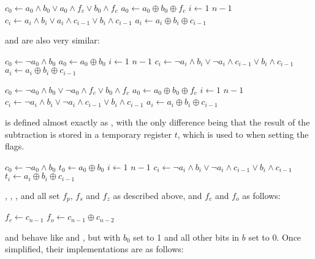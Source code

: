 \documentclass[a4paper,11pt]{kth-mag}
\renewcommand{\gets}{\leftarrow}
\newcommand{\AND}{\land}
\newcommand{\IOR}{\lor}
\newcommand{\XOR}{\oplus}
\newcommand{\NOT}{\lnot}
\begin{document}
\begin{codebox}
\zi $c_0 \gets a_0 \AND b_0 \IOR a_0 \AND f_c \IOR b_0 \AND f_c$
\zi $a_0 \gets a_0 \XOR b_0 \XOR f_c$
\zi \For $i \gets 1$ \To $n-1$
\zi \Do
      $c_i \gets a_i \AND b_i \IOR a_i \AND c_{i-1} \IOR b_i \AND c_{i-1}$
\zi   $a_i \gets a_i \XOR b_i \XOR c_{i-1}$
    \End
\end{codebox}

 and  are also very similar:

\begin{codebox}
\zi $c_0 \gets \NOT a_0 \AND b_0$
\zi $a_0 \gets a_0 \XOR b_0$
\zi \For $i \gets 1$ \To $n-1$
\zi \Do
      $c_i \gets \NOT a_i \AND b_i \IOR \NOT a_i \AND c_{i-1} \IOR b_i \AND c_{i-1}$
\zi   $a_i \gets a_i \XOR b_i \XOR c_{i-1}$
    \End
\end{codebox}

\begin{codebox}
\zi   $c_0 \gets \NOT a_0 \AND b_0 \IOR \NOT a_0 \AND f_c \IOR b_0 \AND f_c$
\zi   $a_0 \gets a_0 \XOR b_0 \XOR f_c$
\zi \For $i \gets 1$ \To $n-1$
\zi \Do
      $c_i \gets \NOT a_i \AND b_i \IOR \NOT a_i \AND c_{i-1} \IOR b_i \AND c_{i-1}$
\zi   $a_i \gets a_i \XOR b_i \XOR c_{i-1}$
    \End
\end{codebox}

 is defined almost exactly as , with the only difference being that the result of the subtraction is stored in a temporary register $t$, which is used to when setting the flags.

\begin{codebox}
\zi $c_0 \gets \NOT a_0 \AND b_0$
\zi $t_0 \gets a_0 \XOR b_0$
\zi \For $i \gets 1$ \To $n-1$
\zi \Do
      $c_i \gets \NOT a_i \AND b_i \IOR \NOT a_i \AND c_{i-1} \IOR b_i \AND c_{i-1}$
\zi   $t_i \gets a_i \XOR b_i \XOR c_{i-1}$
    \End
\end{codebox}

, , ,  and  all set $f_p$, $f_s$ and $f_z$ as described above, and $f_c$ and $f_o$ as follows: %

\begin{codebox}
\zi $f_c \gets c_{n-1}$
\zi $f_o \gets c_{n-1} \XOR c_{n-2}$
\end{codebox}

 and  behave like  and , but with $b_0$ set to 1 and all other bits in $b$ set to 0.
Once simplified, their implementations are as follows:
\end{document}
